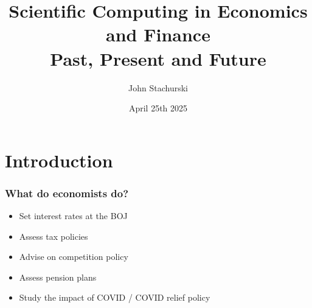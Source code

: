 \documentclass[
    xcolor={svgnames,dvipsnames},
    hyperref={colorlinks, citecolor=DeepPink4, linkcolor=DarkRed, urlcolor=DarkBlue}
    ]{beamer}  %
\title{Scientific Computing in Economics and Finance\\
    Past, Present and Future}
\author{John Stachurski}
\institute{Tokyo College and Australian National University}
\date{April 25th 2025}
\newcommand{\1}{\mathbbm 1}
\begin{document}
\begin{frame}
  \titlepage
\end{frame}





\section{Introduction}



\begin{frame}
    \frametitle{What do economists do?}

    \begin{itemize}
        \item Set interest rates at the BOJ
            \vspace{0.3em}
            \vspace{0.3em}
            \vspace{0.3em}
        \item Assess tax policies
            \vspace{0.3em}
            \vspace{0.3em}
            \vspace{0.3em}
        \item Advise on competition policy 
            \vspace{0.3em}
            \vspace{0.3em}
            \vspace{0.3em}
        \item Assess pension plans
            \vspace{0.3em}
            \vspace{0.3em}
            \vspace{0.3em}
        \item Study the impact of COVID / COVID relief policy
    \end{itemize}


\end{frame}
\end{document}

